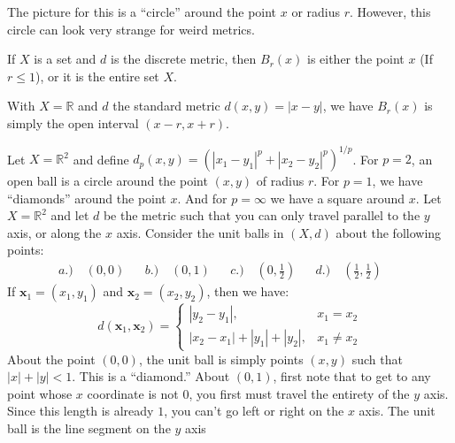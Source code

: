     The picture for this is a ``circle'' around the
    point $x$ or radius $r$. However, this circle
    can look very strange for weird metrics.
    \begin{example}
        If $X$ is a set and $d$ is the discrete metric,
        then $B_{r}(x)$ is either the point $x$
        (If $r\leq{1}$), or it is the entire set $X$.
    \end{example}
    \begin{example}
        With $X=\mathbb{R}$ and $d$ the standard metric
        $d(x,y)=|x-y|$, we have $B_{r}(x)$ is simply
        the open interval $(x-r,x+r)$.
    \end{example}
    \begin{example}
        \label{EXAMPLE:FUNCTIONAL:UNIT_BALLS_EXAMPLE}
        Let $X=\mathbb{R}^{2}$ and define
        $d_{p}(x,y)%
         =(|x_{1}-y_{1}|^{p}+|x_{2}-y_{2}|^{p})^{1/p}$.
        For $p=2$, an open ball is a circle around
        the point $(x,y)$ of radius $r$. For $p=1$,
        we have ``diamonds'' around the point $x$.
        And for $p=\infty$ we have a square
        around $x$.
        Let $X=\mathbb{R}^{2}$ and let $d$ be the metric
        such that you can only travel parallel to the
        $y$ axis, or along the $x$ axis.
        Consider the unit balls in $(X,d)$
        about the following points:
        \begin{align*}
            a.)\quad(0,0)&&
            b.)\quad(0,1)&&
            c.)\quad(0,\tfrac{1}{2})&&
            d.)\quad(\tfrac{1}{2},\tfrac{1}{2})&&
        \end{align*}
        If $\mathbf{x}_{1}=(x_{1},y_{1})$ and
        $\mathbf{x}_{2}=(x_{2},y_{2})$, then we have:
        \begin{equation*}
            d(\mathbf{x}_{1},\mathbf{x}_{2})=
            \begin{cases}
                |y_{2}-y_{1}|,&x_{1}=x_{2}\\
                |x_{2}-x_{1}|+|y_{1}|+|y_{2}|,
                &x_{1}\ne{x_{2}}
            \end{cases}
        \end{equation*}
    About the point $(0,0)$, the unit ball
    is simply points
    $(x,y)$ such that $|x|+|y|<1$. This is a ``diamond.''
    About $(0,1)$, first note that to get to any point
    whose $x$ coordinate is not $0$, you first must travel
    the entirety of the $y$ axis. Since this length is
    already $1$, you can't go left or right
    on the $x$ axis.
    The unit ball is the line segment on the $y$ axis

\end{example}
